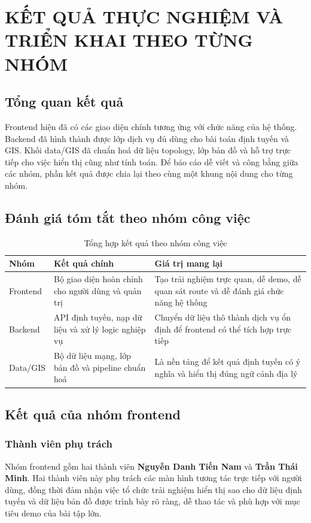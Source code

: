 ﻿\documentclass[../DoAn.tex]{subfiles}
\begin{document}
\chapter{KẾT QUẢ THỰC NGHIỆM VÀ TRIỂN KHAI THEO TỪNG NHÓM}
\label{chapter:results}

\section{Tổng quan kết quả}
Frontend hiện đã có các giao diện chính tương ứng với chức năng của hệ thống. Backend đã hình thành được lớp dịch vụ đủ dùng cho bài toán định tuyến và GIS. Khối data/GIS đã chuẩn hoá dữ liệu topology, lớp bản đồ và hỗ trợ trực tiếp cho việc hiển thị cũng như tính toán. Để báo cáo dễ viết và công bằng giữa các nhóm, phần kết quả được chia lại theo cùng một khung nội dung cho từng nhóm.

\section{Đánh giá tóm tắt theo nhóm công việc}
\begin{table}[H]
\centering
\caption{Tổng hợp kết quả theo nhóm công việc}
\begin{tabular}{|>{\raggedright\arraybackslash}p{2.6cm}|>{\raggedright\arraybackslash}p{4.0cm}|>{\raggedright\arraybackslash}p{6.2cm}|}
\hline
\textbf{Nhóm} & \textbf{Kết quả chính} & \textbf{Giá trị mang lại} \\ \hline
Frontend & Bộ giao diện hoàn chỉnh cho người dùng và quản trị & Tạo trải nghiệm trực quan, dễ demo, dễ quan sát route và dễ đánh giá chức năng hệ thống \\ \hline
Backend & API định tuyến, nạp dữ liệu và xử lý logic nghiệp vụ & Chuyển dữ liệu thô thành dịch vụ ổn định để frontend có thể tích hợp trực tiếp \\ \hline
Data/GIS & Bộ dữ liệu mạng, lớp bản đồ và pipeline chuẩn hoá & Là nền tảng để kết quả định tuyến có ý nghĩa và hiển thị đúng ngữ cảnh địa lý \\ \hline
\end{tabular}
\end{table}

\section{Kết quả của nhóm frontend}
\subsection{Thành viên phụ trách}
Nhóm frontend gồm hai thành viên \textbf{Nguyễn Danh Tiến Nam} và \textbf{Trần Thái Minh}. Hai thành viên này phụ trách các màn hình tương tác trực tiếp với người dùng, đồng thời đảm nhận việc tổ chức trải nghiệm hiển thị sao cho dữ liệu định tuyến và dữ liệu bản đồ được trình bày rõ ràng, dễ thao tác và phù hợp với mục tiêu demo của bài tập lớn.
\end{document}
